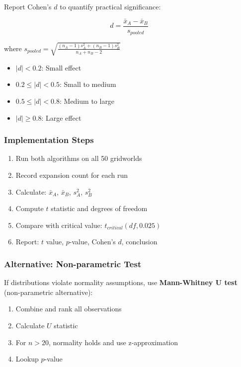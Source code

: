 \documentclass[12pt]{article}
\begin{document}
Report Cohen's $d$ to quantify practical significance:

$$d = \frac{\bar{x}_A - \bar{x}_B}{s_{pooled}}$$

where $s_{pooled} = \sqrt{\frac{(n_A-1)s_A^2 + (n_B-1)s_B^2}{n_A + n_B - 2}}$

\begin{itemize}
    \item $|d| < 0.2$: Small effect
    \item $0.2 \leq |d| < 0.5$: Small to medium
    \item $0.5 \leq |d| < 0.8$: Medium to large
    \item $|d| \geq 0.8$: Large effect
\end{itemize}

\subsubsection{Implementation Steps}

\begin{enumerate}
    \item Run both algorithms on all 50 gridworlds
    \item Record expansion count for each run
    \item Calculate: $\bar{x}_A$, $\bar{x}_B$, $s_A^2$, $s_B^2$
    \item Compute $t$ statistic and degrees of freedom
    \item Compare with critical value: $t_{critical}(df, 0.025)$
    \item Report: $t$ value, $p$-value, Cohen's $d$, conclusion
\end{enumerate}

\subsubsection{Alternative: Non-parametric Test}

If distributions violate normality assumptions, use \textbf{Mann-Whitney U test} 
(non-parametric alternative):

\begin{enumerate}
    \item Combine and rank all observations
    \item Calculate $U$ statistic
    \item For $n > 20$, normality holds and use z-approximation
    \item Lookup $p$-value
\end{enumerate}
\end{document}
